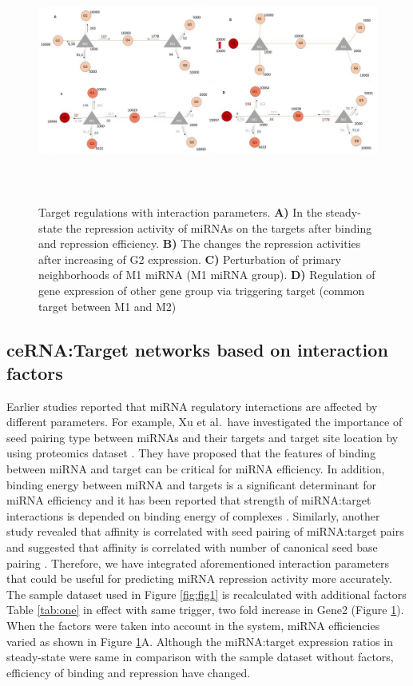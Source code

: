 \documentclass[a4,center,fleqn]{NAR}
\begin{document}
\begin{figure}[ht]
\begin{center}
\includegraphics[width=15cm,height=8cm]{Fig3.jpg}
\end{center}
\caption{Target regulations with interaction parameters. 
     \textbf{A)} In the steady-state the repression activity of miRNAs on the targets after binding and repression efficiency. 
     \textbf{B)} The changes the repression activities after increasing of G2 expression. 
     \textbf{C)} Perturbation of primary neighborhoods of M1 miRNA (M1 miRNA group). 
     \textbf{D)} Regulation of gene expression of other gene group via triggering target (common target between M1 and M2)}
\label{fig:fig3}
\end{figure}

\subsection{ceRNA:Target networks based on interaction factors}

Earlier studies reported that miRNA regulatory interactions are affected
by different parameters. For example, Xu et al.~have investigated the
importance of seed pairing type between miRNAs and their targets and
target site location by using proteomics dataset
\citep{xu_characterization_2014}. They have proposed that the features
of binding between miRNA and target can be critical for miRNA
efficiency. In addition, binding energy between miRNA and targets is a
significant determinant for miRNA efficiency and it has been reported
that strength of miRNA:target interactions is depended on binding energy
of complexes \citep{breda_quantifying_2015}. Similarly, another study
revealed that affinity is correlated with seed pairing of miRNA:target
pairs and suggested that affinity is correlated with number of canonical
seed base pairing \citep{bosson_endogenous_2014}. Therefore, we have
integrated aforementioned interaction parameters that could be useful
for predicting miRNA repression activity more accurately. The sample
dataset used in Figure \ref{fig:fig1} is recalculated with additional
factors Table \ref{tab:one} in effect with same trigger, two fold
increase in Gene2 (Figure \ref{fig:fig3}). When the factors were taken
into account in the system, miRNA efficiencies varied as shown in Figure
\ref{fig:fig3}A. Although the miRNA:target expression ratios in
steady-state were same in comparison with the sample dataset without
factors, efficiency of binding and repression have changed.
\end{document}
